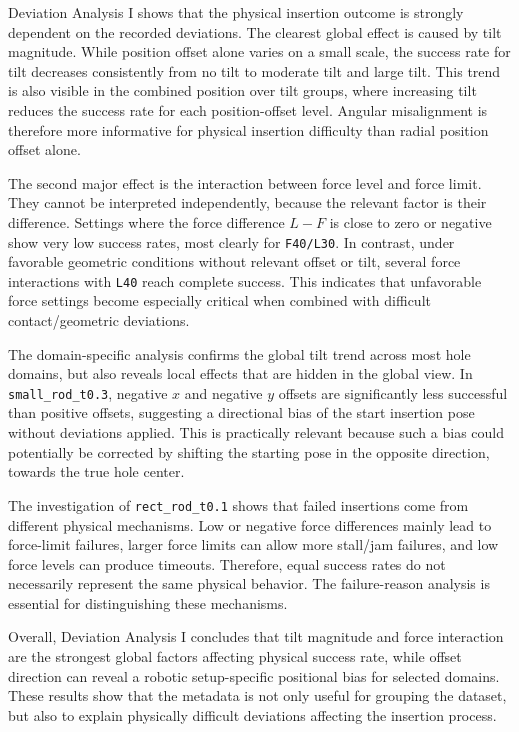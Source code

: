 Deviation Analysis I shows that the physical insertion outcome is strongly dependent on the recorded deviations. The clearest global effect is caused by tilt magnitude. While position offset alone varies on a small scale, the success rate for tilt decreases consistently from no tilt to moderate tilt and large tilt. This trend is also visible in the combined position over tilt groups, where increasing tilt reduces the success rate for each position-offset level. Angular misalignment is therefore more informative for physical insertion difficulty than radial position offset alone.

The second major effect is the interaction between force level and force limit. They cannot be interpreted independently, because the relevant factor is their difference. Settings where the force difference $L-F$ is close to zero or negative show very low success rates, most clearly for \texttt{F40/L30}. In contrast, under favorable geometric conditions without relevant offset or tilt, several force interactions with \texttt{L40} reach complete success. This indicates that unfavorable force settings become especially critical when combined with difficult contact/geometric deviations.

The domain-specific analysis confirms the global tilt trend across most hole domains, but also reveals local effects that are hidden in the global view. In \texttt{small\_rod\_t0.3}, negative $x$ and negative $y$ offsets are significantly less successful than positive offsets, suggesting a directional bias of the start insertion pose without deviations applied. This is practically relevant because such a bias could potentially be corrected by shifting the starting pose in the opposite direction, towards the true hole center.

The investigation of \texttt{rect\_rod\_t0.1} shows that failed insertions come from different physical mechanisms. Low or negative force differences mainly lead to force-limit failures, larger force limits can allow more stall/jam failures, and low force levels can produce timeouts. Therefore, equal success rates do not necessarily represent the same physical behavior. The failure-reason analysis is essential for distinguishing these mechanisms.

Overall, Deviation Analysis I concludes that tilt magnitude and force interaction are the strongest global factors affecting physical success rate, while offset direction can reveal a robotic setup-specific positional bias for selected domains. These results show that the metadata is not only useful for grouping the dataset, but also to explain physically difficult deviations affecting the insertion process.

